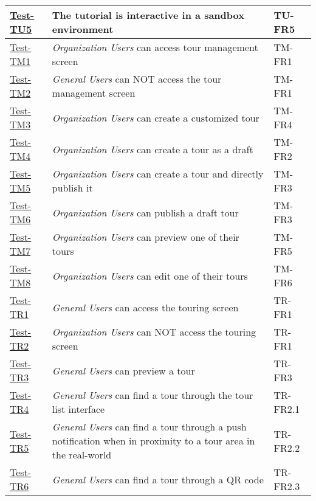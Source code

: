 \documentclass[12pt, titlepage]{article}
\begin{document}
\begin{enumerate}
\begin{table}[h!]
\begin{tabular}{|l|l|l|}
        \hline
        \hyperref[itm:Test-TU5]{Test-TU5} & The tutorial is interactive in a sandbox environment & TU-FR5 \\
        \hline
        \hyperref[itm:Test-TM1]{Test-TM1} & \textit{Organization Users} can access tour management screen & TM-FR1 \\
        \hline
        \hyperref[itm:Test-TM2]{Test-TM2} & \textit{General Users} can NOT access the tour management screen & TM-FR1 \\
        \hline
        \hyperref[itm:Test-TM3]{Test-TM3} & \textit{Organization Users} can create a customized tour & TM-FR4 \\
        \hline
        \hyperref[itm:Test-TM4]{Test-TM4} & \textit{Organization Users} can create a tour as a draft & TM-FR2 \\
        \hline
        \hyperref[itm:Test-TM5]{Test-TM5} & \textit{Organization Users} can create a tour and directly publish it & TM-FR3 \\
        \hline
        \hyperref[itm:Test-TM6]{Test-TM6} & \textit{Organization Users} can publish a draft tour & TM-FR3 \\
        \hline
        \hyperref[itm:Test-TM7]{Test-TM7} & \textit{Organization Users} can preview one of their tours & TM-FR5 \\
        \hline
        \hyperref[itm:Test-TM8]{Test-TM8} & \textit{Organization Users} can edit one of their tours & TM-FR6 \\
        \hline
        \hyperref[itm:Test-TR1]{Test-TR1} & \textit{General Users} can access the touring screen & TR-FR1 \\
        \hline
        \hyperref[itm:Test-TR2]{Test-TR2} & \textit{Organization Users} can NOT access the touring screen & TR-FR1 \\
        \hline
        \hyperref[itm:Test-TR3]{Test-TR3} & \textit{General Users} can preview a tour & TR-FR3 \\
        \hline
        \hyperref[itm:Test-TR4]{Test-TR4} & \textit{General Users} can find a tour through the tour list interface & TR-FR2.1 \\
        \hline
        \hyperref[itm:Test-TR5]{Test-TR5} & \textit{General Users} can find a tour through a push notification when in proximity to a tour area in the real-world & TR-FR2.2 \\
        \hline
        \hyperref[itm:Test-TR6]{Test-TR6} & \textit{General Users} can find a tour through a QR code & TR-FR2.3 \\

\end{tabular}
\end{table}
\end{enumerate}
\end{document}
